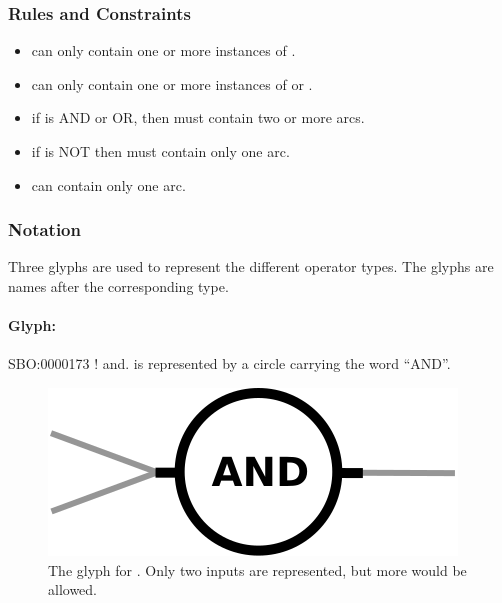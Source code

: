 \subsubsection{Rules and Constraints}

\begin{itemize}
\item {} can only contain one or more instances of
  .
\item {} can only contain one or more instances of
   or .
\item if  is AND or OR, then  must
  contain two or more arcs.
\item if  is NOT then  must
  contain only one arc.
\item {} can contain only one arc.
\end{itemize}

\subsubsection{Notation}

Three glyphs are used to represent the different operator types. The
glyphs are names after the corresponding type.

\paragraph{Glyph: }\label{sec:and}

\begin{glyphDescription}
 \glyphSboTerm SBO:0000173 ! and.
 \glyphNode {} is represented by a circle carrying the word ``AND''.
\end{glyphDescription}

\begin{figure}[H]
  \centering
  \includegraphics[scale = 0.5]{images/and}
  \caption{The \PD glyph for . Only two inputs are represented, but more would be allowed.}
  \label{fig:and}
\end{figure}


